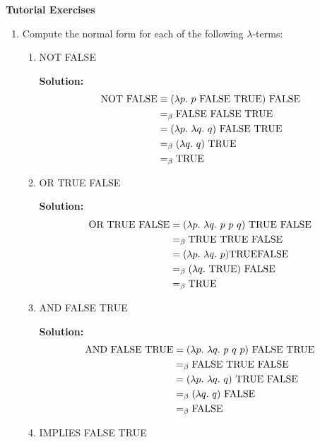 \documentclass[11pt]{report}
\begin{document}
\newpage
{\bf Tutorial Exercises}
\begin{enumerate}
	
	\item Compute the normal form for each of the following $\lambda$-terms:
	
\begin{enumerate}
			\item NOT FALSE
			
			{\bf Solution:}
			\begin{align*}
				\NOT \ \FALSE &\equiv (\lambda p. \ p \ \FALSE \ \TRUE) \ \FALSE \\
				&\beq \FALSE \ \FALSE \ \TRUE \\
				&= (\lambda p. \ \lambda q. \ q) \ \FALSE \ \TRUE \\
				&\beq (\lambda q. \ q) \ \TRUE \\
				&\beq \TRUE
			\end{align*}


			\item OR TRUE FALSE 
			
			{\bf Solution:}
			\begin{align*}
				\text{OR} \ \text{TRUE} \ \text{FALSE} &= (\lambda p. \ \lambda q. \ p \ p \ q) \ \text{TRUE} \ \text{FALSE} \\
				&=_{\beta} \text{TRUE} \ \text{TRUE} \ \text{FALSE} \\
				&= (\lambda p. \ \lambda q. \ p) \text{TRUE} \text{FALSE} \\
				&=_{\beta} (\lambda q. \ \text{TRUE}) \ \text{FALSE} \\
				&=_{\beta} \text{TRUE}
			\end{align*}

			\item AND FALSE TRUE
			 			
			{\bf Solution:}
			\begin{align*}
				\AND \ \FALSE \ \TRUE &= (\lambda p. \ \lambda q. \ p \ q \ p) \ \FALSE \ \TRUE \\
				&\beq \FALSE \ \TRUE \ \FALSE \\
				&= (\lambda p. \ \lambda q. \ q) \ \TRUE \ \FALSE \\
				&\beq (\lambda q. \ q) \ \FALSE \\
				&\beq \FALSE 
			\end{align*}

			\newpage
			\item IMPLIES FALSE TRUE
			

\end{enumerate}
\end{enumerate}
\end{document}
